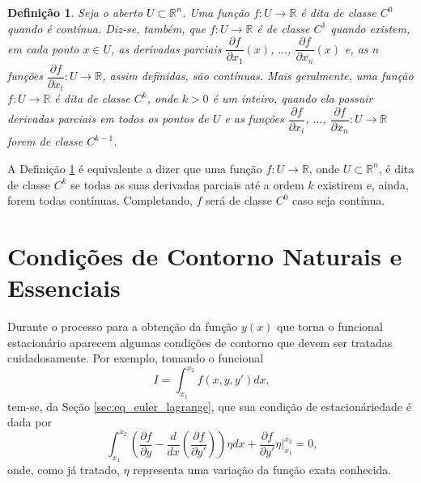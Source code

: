 \documentclass[
	12pt,				%
	openright,			%
    twoside,			%
	a4paper,			%
	english,			%
	french,				%
	spanish,			%
	brazil				%
	]{abntex2}
\newtheorem{definicao}{Definição}
\numberwithin{lema}{chapter}
\numberwithin{teorema}{chapter}
\numberwithin{definicao}{chapter}
\numberwithin{exemplo}{chapter}
\numberwithin{figure}{chapter}
\begin{document}
\begin{apendicesenv}
{	\begin{definicao}
		\label{def:cap_conceitos_analise:classe_ck}
		Seja o aberto $U\subset\mathbb{R}^n$. Uma função $f:U\longrightarrow\mathbb{R}$ é dita de classe $C^0$ quando é contínua. Diz-se, também, que $f:U\longrightarrow\mathbb{R}$ é de classe $C^1$ quando existem, em cada ponto $x\in U$, as derivadas parciais $\dfrac{\partial f}{\partial x_1}(x)$, $\dots$, $\dfrac{\partial f}{\partial x_n}(x)$ e, as $n$ funções $\dfrac{\partial f}{\partial x_i}:U\longrightarrow \mathbb{R}$, assim definidas, são contínuas. Mais geralmente, uma função $f:U\longrightarrow\mathbb{R}$ é dita de classe $C^k$, onde $k>0$ é um inteiro, quando ela possuir derivadas parciais em todos os pontos de $U$ e as funções $\dfrac{\partial f}{\partial x_i}$, $\dots$, $\dfrac{\partial f}{\partial x_n}:U\longrightarrow \mathbb{R}$ forem de classe $C^{k-1}$.
	\end{definicao}
	
	A Definição \ref{def:cap_conceitos_analise:classe_ck} é equivalente a dizer que uma função $f:U\longrightarrow\mathbb{R}$, onde $U\subset\mathbb{R}^n$, é dita de classe $C^k$ se todas as suas derivadas parciais até a ordem $k$ existirem e, ainda, forem todas contínuas. Completando, $f$ será de classe $C^0$ caso seja contínua.
}

\chapter{Condições de Contorno Naturais e Essenciais}
\label{sec:cond_contorno}
{
	Durante o processo para a obtenção da função $y(x)$ que torna o funcional estacionário aparecem algumas condições de contorno que devem ser tratadas cuidadosamente. Por exemplo, tomando o funcional
	$$
		I=\int_{x_1}^{x_2} f(x, y, y')dx
		\text{,}
	$$
	tem-se, da Seção \ref{sec:eq_euler_lagrange}, que sua condição de estacionáriedade é dada por
	\begin{equation}
		\label{eqn:cap_calc_var:cond_boundary}
		\int_{x_1}^{x_2} \left (
			\frac{\partial f}{\partial y}
			-
			\frac{d}{dx} \left (
				\frac{\partial f}{\partial y'}
			\right )
		\right ) \eta dx
		+
		\frac{\partial f}{\partial y'}\eta \Big |_{x_1}^{x_2} = 0
		\text{,}
	\end{equation}
	onde, como já tratado, $\eta$ representa uma variação da função exata conhecida.
	
}
\end{apendicesenv}
\end{document}
